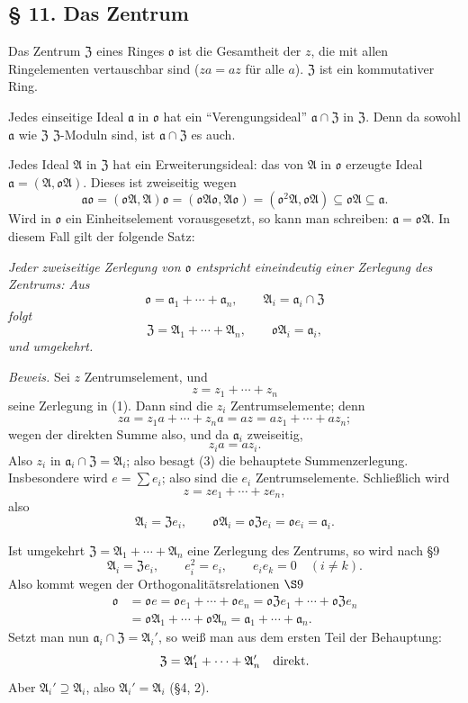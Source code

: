 \documentclass[11pt]{article}
\providecommand{\mA}{\mathfrak{A}}
\providecommand{\mo}{\mathfrak{o}}
\providecommand{\ma}{\mathfrak{a}}
\providecommand{\mZ}{\mathfrak{Z}}
\begin{document}
\subsection*{§ 11. Das Zentrum}

Das Zentrum $\mZ$ eines Ringes $\mo$ ist die Gesamtheit der $z$, die mit allen Ringelementen vertauschbar sind ($za=az$ für alle $a$). $\mZ$ ist ein kommutativer Ring.

Jedes einseitige Ideal $\ma$ in $\mo$ hat ein ``Verengungsideal'' $\ma\cap\mZ$ in $\mZ$. Denn da sowohl $\ma$ wie $\mZ$ $\mZ$-Moduln sind, ist $\ma\cap\mZ$ es auch.

Jedes Ideal $\mA$ in $\mZ$ hat ein Erweiterungsideal: das von $\mA$ in $\mo$ erzeugte Ideal $\ma=(\mA,\mo\mA)$. Dieses ist zweiseitig wegen
\[
        \ma\mo=(\mo\mA,\mA)\mo=(\mo\mA\mo,\mA\mo)
        = (\mo^2\mA,\mo\mA)\subseteq \mo\mA\subseteq\ma.
\]
Wird in $\mo$ ein Einheitselement vorausgesetzt, so kann man schreiben: $\ma=\mo\mA$. In diesem Fall gilt der folgende Satz:

\emph{Jeder zweiseitige Zerlegung von $\mo$ entspricht eineindeutig einer Zerlegung des Zentrums: Aus}
\begin{equation}
        \mo=\ma_1+\cdots+\ma_n,
        \qquad \mA_i=\ma_i\cap\mZ                         \tag{1}
\end{equation}
\emph{folgt}
\begin{equation}
        \mZ=\mA_1+\cdots+\mA_n,
        \qquad \mo\mA_i=\ma_i,                              \tag{2}
\end{equation}
\emph{und umgekehrt.}

\emph{Beweis.} Sei $z$ Zentrumselement, und
\begin{equation}
        z=z_1+\cdots+z_n                                    \tag{3}
\end{equation}
seine Zerlegung in (1). Dann sind die $z_i$ Zentrumselemente; denn
\[
        za=z_1a+\cdots+z_na=az=az_1+\cdots+az_n;
\]
wegen der direkten Summe also, und da $\ma_i$ zweiseitig,
\[
        z_i a=az_i.
\]
Also $z_i$ in $\ma_i\cap\mZ=\mA_i$; also besagt (3) die behauptete Summenzerlegung. Insbesondere wird $e=\sum e_i$; also sind die $e_i$ Zentrumselemente. Schließlich wird
\[
        z=ze_1+\cdots+ze_n,
\]
also
\[
        \mA_i=\mZ e_i,
        \qquad
        \mo\mA_i=\mo\mZ e_i=\mo e_i=\ma_i.
\]

Ist umgekehrt $\mZ=\mA_1+\cdots+\mA_n$ eine Zerlegung des Zentrums, so wird nach §9
\[
        \mA_i=\mZ e_i,
        \qquad e_i^2=e_i,
        \qquad e_i e_k=0\quad(i\ne k).
\]
Also kommt wegen der Orthogonalitätsrelationen \hbox{\(\S 9\)}
\[
\begin{aligned}
        \mo&=\mo e=\mo e_1+\cdots+\mo e_n
        =\mo\mZ e_1+\cdots+\mo\mZ e_n\\
        &=\mo\mA_1+\cdots+\mo\mA_n
        =\ma_1+\cdots+\ma_n .
\end{aligned}
\]
Setzt man nun $\ma_i\cap\mZ=\mA_i'$, so weiß man aus dem ersten Teil der Behauptung:
\[
        \mZ=\mA_1'+\cdots+\mA_n'\quad\hbox{direkt}.
\]
Aber $\mA_i'\supseteq\mA_i$, also $\mA_i'=\mA_i$ (§4, 2).
\end{document}
